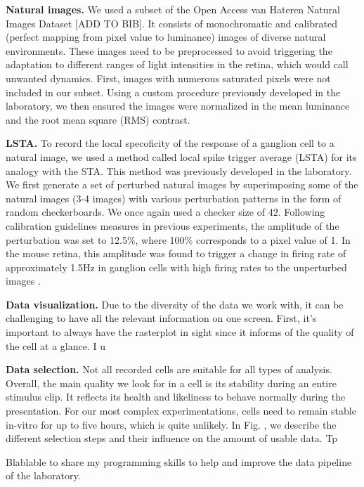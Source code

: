 \textbf{Natural images.}
We used a subset of the Open Access van Hateren Natural Images Dataset [ADD TO
        BIB]. It consists of monochromatic and calibrated (perfect mapping from
pixel
value to luminance) images of diverse natural environments. These images need
to
be preprocessed to avoid triggering the adaptation to different ranges of light
intensities in the retina, which would call unwanted
dynamics. First, images with numerous saturated pixels were not included in our
subset. Using a custom procedure previously developed in the laboratory, we
then
ensured the images were normalized in the mean luminance and the root mean
square (RMS) contrast.

\textbf{LSTA.}
To record the local specoficity of the response of a ganglion cell to a natural
image, we used a method called local spike trigger average (LSTA) for its
analogy with the STA. This method was previously developed in the laboratory.
We first generate a set of perturbed natural images by superimposing some of
the natural images (3-4 images) with various perturbation patterns in the form
of random checkerboards. We once again used a checker size of 42\microns.
Following calibration guidelines measures in previous experiments, the
amplitude of the perturbation was set to 12.5\%, where 100\% corresponds to a
pixel value of 1. In the mouse retina, this amplitude was found to trigger a
change in firing rate of approximately 1.5Hz in ganglion cells with high firing
rates to the unperturbed images \citep{goldin_context-dependent_2022}.

\textbf{Data visualization.}
Due to the diversity of the data we work with, it can be challenging to have
all the relevant information on one screen. First, it's important to always
have the rasterplot in sight since it informs of the quality of the cell at a
glance. I u

\textbf{Data selection.}
Not all recorded cells are suitable for all types of analysis. Overall, the
main
quality we look for in a cell is its stability during an entire stimulus clip.
It reflects its health and likeliness to behave normally during the
presentation. For our most complex experimentations, cells need to remain
stable in-vitro for up to five hours, which is quite unlikely. In Fig. , we
describe the different selection steps and their influence on the amount of
usable data.
Tp

Blablable to share my programming skills to help and improve the data pipeline
of
the
laboratory.

